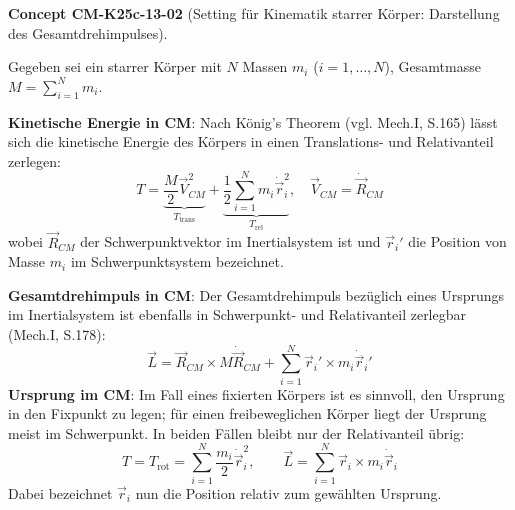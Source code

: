 \documentclass[10pt, letterpaper]{article}
\newcommand{\CustomHeading}[3]{%
  \par\medskip\noindent%
  \textbf{#1 #2} \textnormal{(#3)}.\enskip%
}
\newenvironment{CONC}[2]{\CustomHeading{Concept}{#1}{#2}}{}
\begin{document}
\begin{CONC}{CM-K25c-13-02}{Setting für Kinematik starrer Körper: Darstellung des Gesamtdrehimpulses}
Gegeben sei ein starrer Körper mit $N$ Massen $m_i$ ($i = 1,\dots,N$), Gesamtmasse $M = \sum_{i=1}^N m_i$. 

\textbf{Kinetische Energie in CM}: Nach König’s Theorem (vgl. Mech.I, S.165) lässt sich die kinetische Energie des Körpers in einen Translations- und Relativanteil zerlegen:
\[
T = \underbrace{\frac{M}{2} \vec{V}_{CM}^2}_{T_{\text{trans}}} + \underbrace{\frac{1}{2} \sum_{i=1}^N m_i \dot{\vec{r}}_i^2}_{T_{\text{rel}}}, \quad \vec{V}_{CM} = \dot{\vec{R}}_{CM}
\]
wobei $\vec{R}_{CM}$ der Schwerpunktvektor im Inertialsystem ist und $\vec{r}_i'$ die Position von Masse $m_i$ im Schwerpunktsystem bezeichnet.

\textbf{Gesamtdrehimpuls in CM}: Der Gesamtdrehimpuls bezüglich eines Ursprungs im Inertialsystem ist ebenfalls in Schwerpunkt- und Relativanteil zerlegbar (Mech.I, S.178):
\[
\vec{L} = \vec{R}_{CM} \times M \dot{\vec{R}}_{CM} + \sum_{i=1}^N \vec{r}_i' \times m_i \dot{\vec{r}}_i'
\]
\textbf{Ursprung im CM}: Im Fall eines fixierten Körpers ist es sinnvoll, den Ursprung in den Fixpunkt zu legen; für einen freibeweglichen Körper liegt der Ursprung meist im Schwerpunkt. In beiden Fällen bleibt nur der Relativanteil übrig:
\[
T = T_{\text{rot}} = \sum_{i=1}^N \frac{m_i}{2} \dot{\vec{r}}_i^2, \qquad
\vec{L} = \sum_{i=1}^N \vec{r}_i \times m_i \dot{\vec{r}}_i
\]
Dabei bezeichnet $\vec{r}_i$ nun die Position relativ zum gewählten Ursprung. 


\end{CONC}
\end{document}
